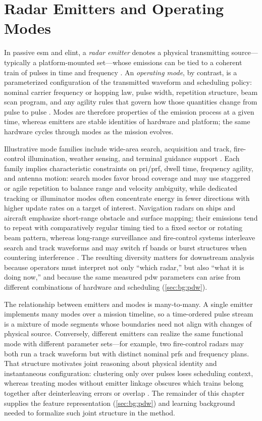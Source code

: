 \section{Radar Emitters and Operating Modes}\label{sec:bg:emitters}

In passive \gls{esm} and \gls{elint}, a \emph{radar emitter} denotes a physical transmitting source---typically a platform-mounted set---whose emissions can be tied to a coherent train of pulses in time and frequency \parencite{wiley2006elint}.
An \emph{operating mode}, by contrast, is a parameterized configuration of the transmitted waveform and scheduling policy: nominal carrier frequency or hopping law, pulse width, repetition structure, beam scan program, and any agility rules that govern how those quantities change from pulse to pulse \parencite{skolnik2008radar,wiley2006elint}.
Modes are therefore properties of the emission process at a given time, whereas emitters are stable identities of hardware and platform; the same hardware cycles through modes as the mission evolves.

Illustrative mode families include wide-area search, acquisition and track, fire-control illumination, weather sensing, and terminal guidance support \parencite{skolnik2008radar}.
Each family implies characteristic constraints on \gls{pri}/\gls{prf}, dwell time, frequency agility, and antenna motion: search modes favor broad coverage and may use staggered or agile repetition to balance range and velocity ambiguity, while dedicated tracking or illuminator modes often concentrate energy in fewer directions with higher update rates on a target of interest.
Navigation radars on ships and aircraft emphasize short-range obstacle and surface mapping; their emissions tend to repeat with comparatively regular timing tied to a fixed sector or rotating beam pattern, whereas long-range surveillance and fire-control systems interleave search and track waveforms and may switch \gls{rf} bands or burst structures when countering interference \parencite{skolnik2008radar,wiley2006elint}.
The resulting diversity matters for downstream analysis because operators must interpret not only ``which radar,'' but also ``what it is doing now,'' and because the same measured \gls{pdw} parameters can arise from different combinations of hardware and scheduling (\cref{sec:bg:pdw}).

The relationship between emitters and modes is many-to-many.
A single emitter implements many modes over a mission timeline, so a time-ordered pulse stream is a mixture of mode segments whose boundaries need not align with changes of physical source.
Conversely, different emitters can realize the same functional mode with different parameter sets---for example, two fire-control radars may both run a track waveform but with distinct nominal \glspl{prf} and frequency plans.
That structure motivates joint reasoning about physical identity and instantaneous configuration: clustering only over pulses loses scheduling context, whereas treating modes without emitter linkage obscures which trains belong together after deinterleaving errors or overlap \parencite{wiley2006elint}.
The remainder of this chapter supplies the feature representation (\cref{sec:bg:pdw}) and learning background needed to formalize such joint structure in the method.
